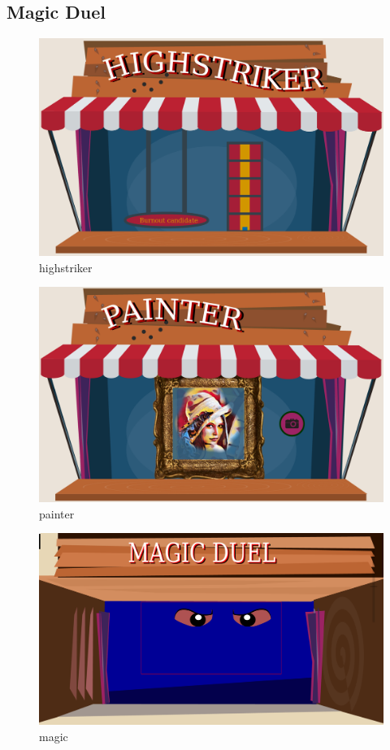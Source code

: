\documentclass{utue} %
\begin{document}
\subsection{Magic Duel}


\begin{figure}[]
	\centering
	\includegraphics[width=1.0\textwidth]{images/highstriker.png}
	\caption{highstriker}
	\label{fig:highstriker}
\end{figure}
\begin{figure}[]
	\centering
	\includegraphics[width=1.0\textwidth]{images/painter.png}
	\caption{painter}
	\label{fig:painter}
\end{figure}
\begin{figure}[]
	\centering
	\includegraphics[width=1.0\textwidth]{images/magic.png}
	\caption{magic}
	\label{fig:magic}
\end{figure}
\end{document}
